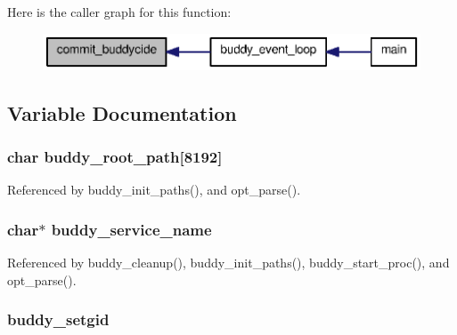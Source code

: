 Here is the caller graph for this function:\nopagebreak
\begin{figure}[H]
\begin{center}
\leavevmode
\includegraphics[width=348pt]{buddy_8h_ab7a98a53dac20e00f111f46389698b1d_icgraph}
\end{center}
\end{figure}




\subsection{Variable Documentation}
\subsubsection[{buddy\_\-root\_\-path}]{\setlength{\rightskip}{0pt plus 5cm}char {\bf buddy\_\-root\_\-path}[8192]}\label{buddy_8h_a97a960eb2ad1d03155879c0cb585f4c4}


Referenced by buddy\_\-init\_\-paths(), and opt\_\-parse().

\subsubsection[{buddy\_\-service\_\-name}]{\setlength{\rightskip}{0pt plus 5cm}char$\ast$ {\bf buddy\_\-service\_\-name}}\label{buddy_8h_a46bdaaaea058028488e4a2fa4abcf80b}


Referenced by buddy\_\-cleanup(), buddy\_\-init\_\-paths(), buddy\_\-start\_\-proc(), and opt\_\-parse().

\subsubsection[{buddy\_\-setgid}]{ {\bf buddy\_\-setgid}}\label{buddy_8h_a94f0c0963c51ae59585d090bd146267c}



